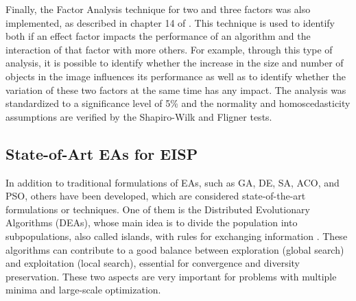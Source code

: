 				Finally, the Factor Analysis technique for two and three factors was also implemented, as described in chapter 14 of \citep{montgomery2010applied}. This technique is used to identify both if an effect factor impacts the performance of an algorithm and the interaction of that factor with more others. For example, through this type of analysis, it is possible to identify whether the increase in the size and number of objects in the image influences its performance as well as to identify whether the variation of these two factors at the same time has any impact. The analysis was standardized to a significance level of 5\% and the normality and homoscedasticity assumptions are verified by the Shapiro-Wilk and Fligner tests.


		\subsection{State-of-Art EAs for EISP}\label{chap:investigation:proposal:stateofart}
			
			In addition to traditional formulations of EAs, such as GA, DE, SA, ACO, and PSO, others have been developed, which are considered state-of-the-art formulations or techniques. One of them is the Distributed Evolutionary Algorithms (DEAs), whose main idea is to divide the population into subpopulations, also called islands, with rules for exchanging information \citep{gong2015distributed}. These algorithms can contribute to a good balance between exploration (global search) and exploitation (local search), essential for convergence and diversity preservation. These two aspects are very important for problems with multiple minima and large-scale optimization.
			
